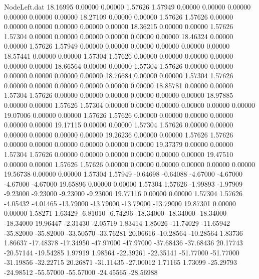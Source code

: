 \begin{filecontents}{NodeLeft.dat}
  18.16995    0.00000    0.00000     1.57626    1.57949    0.00000    0.00000    0.00000    0.00000    0.00000    0.00000
  18.27109    0.00000    0.00000     1.57626    1.57626    0.00000    0.00000    0.00000    0.00000    0.00000    0.00000
  18.36215    0.00000    0.00000     1.57626    1.57304    0.00000    0.00000    0.00000    0.00000    0.00000    0.00000
  18.46324    0.00000    0.00000     1.57626    1.57949    0.00000    0.00000    0.00000    0.00000    0.00000    0.00000
  18.57441    0.00000    0.00000     1.57304    1.57626    0.00000    0.00000    0.00000    0.00000    0.00000    0.00000
  18.66564    0.00000    0.00000     1.57304    1.57626    0.00000    0.00000    0.00000    0.00000    0.00000    0.00000
  18.76684    0.00000    0.00000     1.57304    1.57626    0.00000    0.00000    0.00000    0.00000    0.00000    0.00000
  18.85781    0.00000    0.00000     1.57304    1.57626    0.00000    0.00000    0.00000    0.00000    0.00000    0.00000
  18.97885    0.00000    0.00000     1.57626    1.57304    0.00000    0.00000    0.00000    0.00000    0.00000    0.00000
  19.07006    0.00000    0.00000     1.57626    1.57626    0.00000    0.00000    0.00000    0.00000    0.00000    0.00000
  19.17115    0.00000    0.00000     1.57304    1.57626    0.00000    0.00000    0.00000    0.00000    0.00000    0.00000
  19.26236    0.00000    0.00000     1.57626    1.57626    0.00000    0.00000    0.00000    0.00000    0.00000    0.00000
  19.37379    0.00000    0.00000     1.57304    1.57626    0.00000    0.00000    0.00000    0.00000    0.00000    0.00000
  19.47510    0.00000    0.00000     1.57626    1.57626    0.00000    0.00000    0.00000    0.00000    0.00000    0.00000
  19.56738    0.00000    0.00000     1.57304    1.57949   -0.64698   -0.64088   -4.67000   -4.67000   -4.67000   -4.67000
  19.65896    0.00000    0.00000     1.57304    1.57626   -1.99893   -1.97909   -9.23000   -9.23000   -9.23000   -9.23000
  19.77116    0.00000    0.00000     1.57304    1.57626   -4.05432   -4.01465  -13.79000  -13.79000  -13.79000  -13.79000
  19.87301    0.00000    0.00000     1.58271    1.63429   -6.81010   -6.74296  -18.34000  -18.34000  -18.34000  -18.34000
  19.96447   -2.31430   -2.05719     1.83414    1.85026  -11.74029  -11.65942  -35.82000  -35.82000  -33.50570  -33.76281
  20.06616  -10.28564  -10.28564     1.83736    1.86637  -17.48378  -17.34950  -47.97000  -47.97000  -37.68436  -37.68436
  20.17743  -20.57144  -19.54285     1.97919    1.98564  -22.39261  -22.35141  -51.77000  -51.77000  -31.19856  -32.22715
  20.26871  -31.11435  -27.00012     1.71165    1.73099  -25.29793  -24.98512  -55.57000  -55.57000  -24.45565  -28.56988

\end{filecontents}
